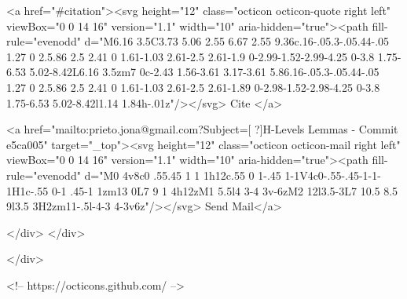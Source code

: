       <a  href="#citation"><svg height="12" class="octicon octicon-quote right left" viewBox="0 0 14 16" version="1.1" width="10" aria-hidden="true"><path fill-rule="evenodd" d="M6.16 3.5C3.73 5.06 2.55 6.67 2.55 9.36c.16-.05.3-.05.44-.05 1.27 0 2.5.86 2.5 2.41 0 1.61-1.03 2.61-2.5 2.61-1.9 0-2.99-1.52-2.99-4.25 0-3.8 1.75-6.53 5.02-8.42L6.16 3.5zm7 0c-2.43 1.56-3.61 3.17-3.61 5.86.16-.05.3-.05.44-.05 1.27 0 2.5.86 2.5 2.41 0 1.61-1.03 2.61-2.5 2.61-1.89 0-2.98-1.52-2.98-4.25 0-3.8 1.75-6.53 5.02-8.42l1.14 1.84h-.01z"/></svg> Cite
      </a>

      <a href="mailto:prieto.jona@gmail.com?Subject=[ ?]H-Levels Lemmas - Commit e5ca005" target="_top"><svg height="12" class="octicon octicon-mail right left" viewBox="0 0 14 16" version="1.1" width="10" aria-hidden="true"><path fill-rule="evenodd" d="M0 4v8c0 .55.45 1 1 1h12c.55 0 1-.45 1-1V4c0-.55-.45-1-1-1H1c-.55 0-1 .45-1 1zm13 0L7 9 1 4h12zM1 5.5l4 3-4 3v-6zM2 12l3.5-3L7 10.5 8.5 9l3.5 3H2zm11-.5l-4-3 4-3v6z"/></svg> Send Mail</a>

    </div>
  </div>

</div>

<!-- https://octicons.github.com/ -->





